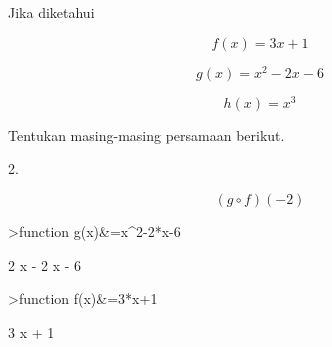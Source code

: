 \documentclass{article}
\begin{document}
\begin{eulernotebook}
\begin{eulercomment}
\begin{eulercomment}
\begin{eulercomment}
\begin{eulercomment}
\begin{eulercomment}
\begin{eulercomment}
\begin{eulercomment}
\begin{eulercomment}
\begin{eulercomment}
\begin{eulercomment}
\begin{eulercomment}
\begin{eulercomment}
\begin{eulercomment}
\begin{eulercomment}
\begin{eulercomment}
\begin{eulercomment}
\begin{eulercomment}
\begin{eulercomment}
\begin{eulercomment}
\begin{eulercomment}
\begin{eulercomment}
Jika diketahui\\
\end{eulercomment}
\begin{eulerformula}
\[
f(x)=3x+1
\]
\end{eulerformula}
\begin{eulerformula}
\[
g(x)=x^2-2x-6
\]
\end{eulerformula}
\begin{eulerformula}
\[
h(x)=x^3
\]
\end{eulerformula}
\begin{eulercomment}
Tentukan masing-masing persamaan berikut.

2.\\
\end{eulercomment}
\begin{eulerformula}
\[
(g\circ f)(-2)
\]
\end{eulerformula}
\begin{eulerprompt}
>function g(x)&=x^2-2*x-6
\end{eulerprompt}
\begin{euleroutput}
  
                                2
                               x  - 2 x - 6
  
\end{euleroutput}
\begin{eulerprompt}
>function f(x)&=3*x+1
\end{eulerprompt}
\begin{euleroutput}
  
                                 3 x + 1
  

\end{euleroutput}
\end{eulercomment}
\end{eulercomment}
\end{eulercomment}
\end{eulercomment}
\end{eulercomment}
\end{eulercomment}
\end{eulercomment}
\end{eulercomment}
\end{eulercomment}
\end{eulercomment}
\end{eulercomment}
\end{eulercomment}
\end{eulercomment}
\end{eulercomment}
\end{eulercomment}
\end{eulercomment}
\end{eulercomment}
\end{eulercomment}
\end{eulercomment}
\end{eulercomment}
\end{eulernotebook}
\end{document}
